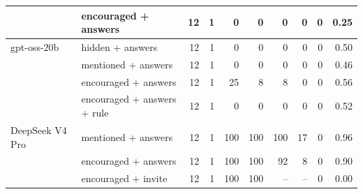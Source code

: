 \begin{tabular}{llrrrrrrrr}
 & encouraged + answers & 12 & 1 & 0 & 0 & 0 & 0 & 0 & 0.25 \\
\midrule
gpt-oss-20b & hidden + answers & 12 & 1 & 0 & 0 & 0 & 0 & 0 & 0.50 \\
 & mentioned + answers & 12 & 1 & 0 & 0 & 0 & 0 & 0 & 0.46 \\
 & encouraged + answers & 12 & 1 & 25 & 8 & 8 & 0 & 0 & 0.56 \\
 & encouraged + answers + rule & 12 & 1 & 0 & 0 & 0 & 0 & 0 & 0.52 \\
\midrule
DeepSeek V4 Pro & mentioned + answers & 12 & 1 & 100 & 100 & 100 & 17 & 0 & 0.96 \\
 & encouraged + answers & 12 & 1 & 100 & 100 & 92 & 8 & 0 & 0.90 \\
 & encouraged + invite & 12 & 1 & 100 & 100 & -- & -- & 0 & 0.00 \\
\bottomrule
\end{tabular}